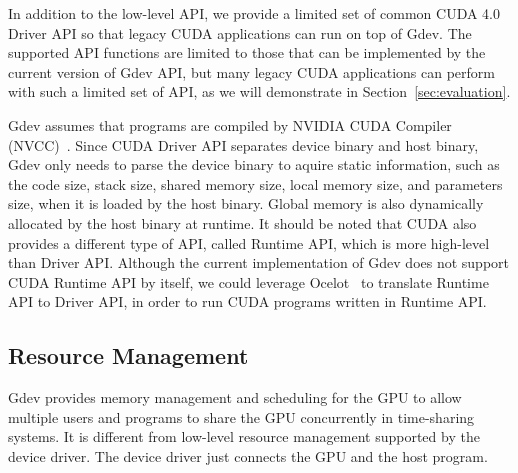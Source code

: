 In addition to the low-level API, we provide a limited set of common
CUDA 4.0 Driver API so that legacy CUDA applications can run on top of
Gdev.
The supported API functions are limited to those that can be implemented
by the current version of Gdev API, but many legacy CUDA applications
can perform with such a limited set of API, as we will demonstrate in
Section~\ref{sec:evaluation}.

Gdev assumes that programs are compiled by NVIDIA CUDA Compiler
(NVCC)~\cite{CUDA40}.
Since CUDA Driver API separates device binary and host binary, Gdev only
needs to parse the device binary to aquire static information, such
as the code size, stack size, shared memory size, local memory size, and
parameters size, when it is loaded by the host binary.
Global memory is also dynamically allocated by the host binary at
runtime.
It should be noted that CUDA also provides a different type of API,
called Runtime API, which is more high-level than Driver API.
Although the current implementation of Gdev does not support CUDA
Runtime API by itself, we could leverage Ocelot~\cite{Diamos_PACT10} to
translate Runtime API to Driver API, in order to run CUDA programs
written in Runtime API.

\subsection{Resource Management}

Gdev provides memory management and scheduling for the GPU to allow
multiple users and programs to share the GPU concurrently in
time-sharing systems.
It is different from low-level resource management supported by the
device driver.
The device driver just connects the GPU and the host program.